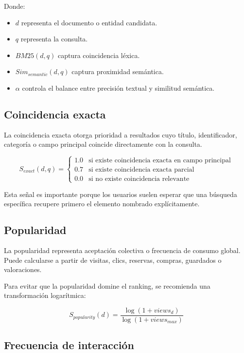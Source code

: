 \documentclass[12pt,a4paper]{article}
\begin{document}
Donde:

\begin{itemize}[noitemsep]
    \item $d$ representa el documento o entidad candidata.
    \item $q$ representa la consulta.
    \item $BM25(d,q)$ captura coincidencia léxica.
    \item $Sim_{semantic}(d,q)$ captura proximidad semántica.
    \item $\alpha$ controla el balance entre precisión textual y similitud semántica.
\end{itemize}

\subsection{Coincidencia exacta}

La coincidencia exacta otorga prioridad a resultados cuyo título, identificador, categoría o campo principal coincide directamente con la consulta.

\[
S_{exact}(d,q) =
\begin{cases}
1.0 & \text{si existe coincidencia exacta en campo principal}\\
0.7 & \text{si existe coincidencia exacta parcial}\\
0.0 & \text{si no existe coincidencia relevante}
\end{cases}
\]

Esta señal es importante porque los usuarios suelen esperar que una búsqueda específica recupere primero el elemento nombrado explícitamente.

\subsection{Popularidad}

La popularidad representa aceptación colectiva o frecuencia de consumo global. Puede calcularse a partir de visitas, clics, reservas, compras, guardados o valoraciones.

Para evitar que la popularidad domine el ranking, se recomienda una transformación logarítmica:

\[
S_{popularity}(d) = \frac{\log(1 + views_d)}{\log(1 + views_{max})}
\]

\subsection{Frecuencia de interacción}
\end{document}
